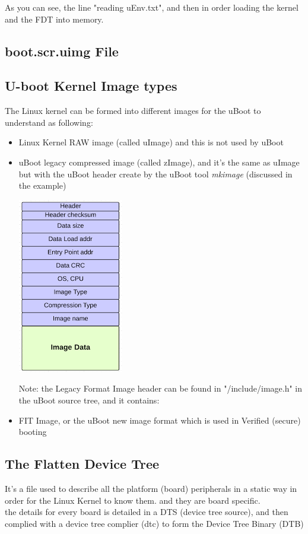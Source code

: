 \documentclass{article}
\begin{document}
As you can see, the line "reading uEnv.txt", and then in order loading the kernel and the FDT into memory.


\subsection{boot.scr.uimg File}

\subsection{U-boot Kernel Image types}
The Linux kernel can be formed into different images for the uBoot to understand as following:
\begin{itemize}
    \item Linux Kernel RAW image (called uImage) and this is not used by uBoot
    \item uBoot legacy compressed image (called zImage), and it's the same as uImage but with the uBoot header create by the uBoot tool \textit{mkimage} (discussed in the example)
    
    \begin{center}
    \includegraphics[scale=0.50]{./resources/img/zImage.png}
    \end{center}

    Note: the Legacy Format Image header can be found in "/include/image.h" in the uBoot source tree, and it contains:
    

    \item FIT Image, or the uBoot new image format which is used in Verified (secure) booting
\end{itemize}

\subsection{The Flatten Device Tree}
It's a file used to describe all the platform (board) peripherals in a static way in order for the Linux Kernel to know them. and they are board specific.\\
the details for every board is detailed in a DTS (device tree source), and then complied with a device tree complier (dtc) to form the Device Tree Binary (DTB) 
\end{document}
